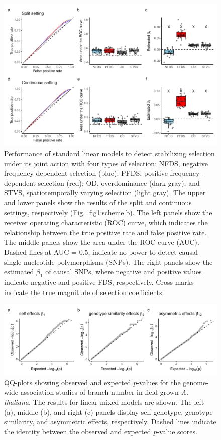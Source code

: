 \documentclass[12pt,]{article}
\begin{document}
\begin{figure}[]
  \includegraphics[width=\linewidth]{beta1LMdomi.pdf}
  \caption{Performance of standard linear models to detect stabilizing selection under its joint action with four types of selection:  NFDS, negative frequency-dependent selection (blue); PFDS, positive frequency-dependent selection (red); OD, overdominance (dark gray); and STVS, spatiotemporally varying selection (light gray). The upper and lower panels show the results of the split and continuous settings, respectively (Fig. \ref{fig1:scheme}b). The left panels show the receiver operating characteristic (ROC) curve, which indicates the relationship between the true positive rate and false positive rate. The middle panels show the area under the ROC curve (AUC). Dashed lines at AUC = 0.5, indicate no power to detect causal single nucleotide polymorphisms (SNPs). The right panels show the estimated $\beta_1$ of causal SNPs, where negative and positive values indicate negative and positive FDS, respectively. Cross marks indicate the true magnitude of selection coefficients.}
  \label{figS7:beta1LM}
\end{figure}


\begin{figure}[]
  \includegraphics[width=\linewidth]{QQplotLMM.png}
  \caption{QQ-plots showing observed and expected $p$-values for the genome-wide association studies of branch number in field-grown \textit{A. thaliana}. The results for linear mixed models are shown. The left (a), middle (b), and right (c) panels display self-genotype, genotype similarity, and asymmetric effects, respectively. Dashed lines indicate the identity between the observed and expected $p$-value scores.}
  \label{figS9:QQplotLMM}
\end{figure}
\end{document}
